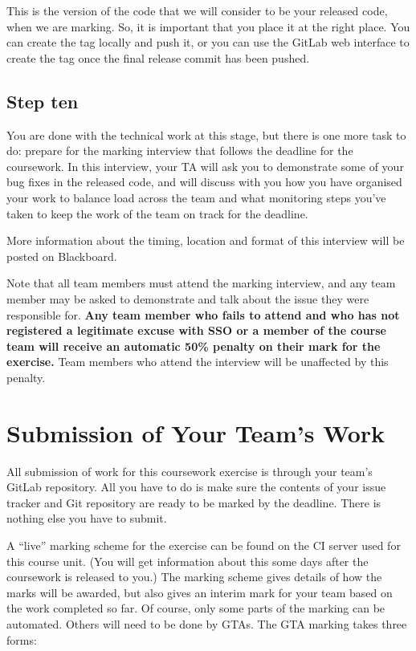 \documentclass[
]{book}
\begin{document}
This is the version of the code that we will consider to be your released code, when we are marking. So, it is important that you place it at the right place. You can create the tag locally and push it, or you can use the GitLab web interface to create the tag once the final release commit has been pushed.

\hypertarget{stepten}{%
\subsection{Step ten}\label{stepten}}

You are done with the technical work at this stage, but there is one more task to do: prepare for the marking interview that follows the deadline for the coursework. In this interview, your TA will ask you to demonstrate some of your bug fixes in the released code, and will discuss with you how you have organised your work to balance load across the team and what monitoring steps you've taken to keep the work of the team on track for the deadline.

More information about the timing, location and format of this interview will be posted on Blackboard.

Note that all team members must attend the marking interview, and any team member may be asked to demonstrate and talk about the issue they were responsible for. \textbf{Any team member who fails to attend and who has not registered a legitimate excuse with SSO or a member of the course team will receive an automatic 50\% penalty on their mark for the exercise.} Team members who attend the interview will be unaffected by this penalty.

\hypertarget{imdone}{%
\section{Submission of Your Team's Work}\label{imdone}}

All submission of work for this coursework exercise is through your team's GitLab repository. All you have to do is make sure the contents of your issue tracker and Git repository are ready to be marked by the deadline. There is nothing else you have to submit.

A ``live'' marking scheme for the exercise can be found on the CI server used for this course unit. (You will get information about this some days after the coursework is released to you.) The marking scheme gives details of how the marks will be awarded, but also gives an interim mark for your team based on the work completed so far. Of course, only some parts of the marking can be automated. Others will need to be done by GTAs. The GTA marking takes three forms:
\end{document}
